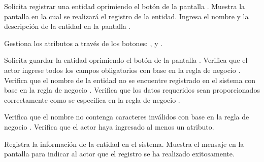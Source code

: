  \begin{UCtrayectoria}
    \UCpaso[\UCactor] Solicita registrar una entidad oprimiendo el botón  de la pantalla .
    \UCpaso[\UCsist] Muestra la pantalla  en la cual se realizará el registro de la entidad. 
    \UCpaso[\UCactor] Ingresa el nombre y la descripción de la entidad en la pantalla . \label{cu11.1:ingresaDatos}
    
    \UCpaso[\UCactor] Gestiona los atributos a través de los botones: , \btnEditar y \btnEliminar. \label{cu11.1:gestionar}
    
    \UCpaso[\UCactor] Solicita guardar la entidad oprimiendo el botón  de la pantalla . 
    \UCpaso[\UCsist] Verifica que el actor ingrese todos los campos obligatorios con base en la regla de negocio  . 
    \UCpaso[\UCsist] Verifica que el nombre de la entidad no se encuentre registrado en el sistema con base en la regla de negocio  . 
    \UCpaso[\UCsist] Verifica que los datos requeridos sean proporcionados correctamente como se especifica en la regla de negocio . 
    
    \UCpaso[\UCsist] Verifica que el nombre no contenga caracteres inválidos con base en la regla de negocio . 
    \UCpaso[\UCsist] Verifica que el actor haya ingresado al menos un atributo. 

    \UCpaso[\UCsist] Registra la información de la entidad en el sistema.
    \UCpaso[\UCsist] Muestra el mensaje  en la pantalla  
    para indicar al actor que el registro se ha realizado exitosamente.
 \end{UCtrayectoria}
 
